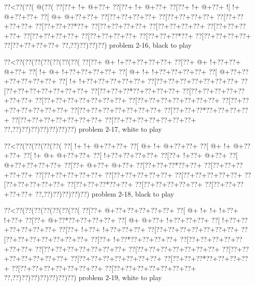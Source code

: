 \vbox{\vbox{\goo
\0??<\0??(\0??(\- @(\0??(
\0??[\0??+\- !+\- @+\0??+
\0??[\0??+\- !+\- @+\0??+
\0??[\0??+\- !+\- @+\0??+
\- ![\- !+\- @+\0??+\0??+
\0??[\- @+\- @+\0??+\0??+
\0??[\0??+\0??+\0??+\0??+
\0??[\0??+\0??+\0??+\0??+
\0??[\0??+\0??+\0??+\0??+
\0??[\0??+\0??+\0??*\0??+
\0??[\0??+\0??+\0??+\0??+
\0??[\0??+\0??+\0??+\0??+
\0??[\0??+\0??+\0??+\0??+
\0??[\0??+\0??+\0??+\0??+
\0??[\0??+\0??+\0??+\0??+
\0??[\0??+\0??+\0??*\0??+
\0??[\0??+\0??+\0??+\0??+
\0??[\0??+\0??+\0??+\0??+
\0??,\0??)\0??)\0??)\0??)
}
\hfil problem 2-16, black to play\hfil\break
}

\vbox{\vbox{\goo
\0??<\0??(\0??(\0??(\0??(\0??(\0??(\0??(
\0??[\0??+\- @+\- !+\0??+\0??+\0??+\0??+
\0??[\0??+\- @+\- !+\0??+\0??+\- @+\0??+
\0??[\- !+\- @+\- !+\0??+\0??+\0??+\0??+
\0??[\- @+\- !+\- !+\0??+\0??+\0??+\0??+
\0??[\- @+\0??+\0??+\0??+\0??+\0??+\0??+
\0??[\- !+\- !+\0??+\0??+\0??+\0??+\0??+
\0??[\0??+\0??+\0??+\0??+\0??+\0??+\0??+
\0??[\0??+\0??+\0??+\0??+\0??+\0??+\0??+
\0??[\0??+\0??+\0??*\0??+\0??+\0??+\0??+
\0??[\0??+\0??+\0??+\0??+\0??+\0??+\0??+
\0??[\0??+\0??+\0??+\0??+\0??+\0??+\0??+
\0??[\0??+\0??+\0??+\0??+\0??+\0??+\0??+
\0??[\0??+\0??+\0??+\0??+\0??+\0??+\0??+
\0??[\0??+\0??+\0??+\0??+\0??+\0??+\0??+
\0??[\0??+\0??+\0??*\0??+\0??+\0??+\0??+
\0??[\0??+\0??+\0??+\0??+\0??+\0??+\0??+
\0??[\0??+\0??+\0??+\0??+\0??+\0??+\0??+
\0??,\0??)\0??)\0??)\0??)\0??)\0??)\0??)
}
\hfil problem 2-17, white to play\hfil\break
}

\vbox{\vbox{\goo
\0??<\0??(\0??(\0??(\0??(\0??(
\0??[\- !+\- !+\- @+\0??+\0??+
\0??[\- @+\- !+\- @+\0??+\0??+
\0??[\- @+\- !+\- @+\0??+\0??+
\0??[\- !+\- @+\- @+\0??+\0??+
\0??[\- !+\0??+\0??+\0??+\0??+
\0??[\0??+\- !+\0??+\- @+\0??+
\0??[\- @+\0??+\0??+\0??+\0??+
\0??[\0??+\- @+\0??+\- @+\0??+
\0??[\0??+\0??+\0??*\0??+\0??+
\0??[\0??+\0??+\0??+\0??+\0??+
\0??[\0??+\0??+\0??+\0??+\0??+
\0??[\0??+\0??+\0??+\0??+\0??+
\0??[\0??+\0??+\0??+\0??+\0??+
\0??[\0??+\0??+\0??+\0??+\0??+
\0??[\0??+\0??+\0??*\0??+\0??+
\0??[\0??+\0??+\0??+\0??+\0??+
\0??[\0??+\0??+\0??+\0??+\0??+
\0??,\0??)\0??)\0??)\0??)\0??)
}
\hfil problem 2-18, black to play\hfil\break
}

\vbox{\vbox{\goo
\0??<\0??(\0??(\0??(\0??(\0??(\0??(\0??(
\0??[\0??+\- @+\0??+\0??+\0??+\0??+\0??+
\0??[\- @+\- !+\- !+\- !+\0??+\- !+\0??+
\0??[\0??+\- @+\0??*\0??+\0??+\0??+\0??+
\0??[\- @+\- @+\0??+\- !+\0??+\0??+\0??+
\0??[\- !+\0??+\0??+\0??+\0??+\0??+\0??+
\0??[\0??+\- !+\0??+\- !+\0??+\0??+\0??+
\0??[\0??+\0??+\0??+\0??+\0??+\0??+\0??+
\0??[\0??+\0??+\0??+\0??+\0??+\0??+\0??+
\0??[\0??+\- !+\0??*\0??+\0??+\0??+\0??+
\0??[\0??+\0??+\0??+\0??+\0??+\0??+\0??+
\0??[\0??+\0??+\0??+\0??+\0??+\0??+\0??+
\0??[\0??+\0??+\0??+\0??+\0??+\0??+\0??+
\0??[\0??+\0??+\0??+\0??+\0??+\0??+\0??+
\0??[\0??+\0??+\0??+\0??+\0??+\0??+\0??+
\0??[\0??+\0??+\0??*\0??+\0??+\0??+\0??+
\0??[\0??+\0??+\0??+\0??+\0??+\0??+\0??+
\0??[\0??+\0??+\0??+\0??+\0??+\0??+\0??+
\0??,\0??)\0??)\0??)\0??)\0??)\0??)\0??)
}
\hfil problem 2-19, white to play\hfil\break
}

